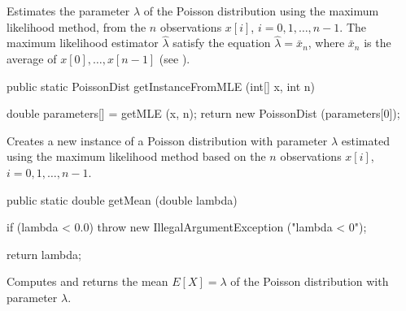 \begin{tabb}
   Estimates the parameter $\lambda$ of the Poisson distribution
   using the maximum likelihood method, from the $n$ observations
   $x[i]$, $i = 0, 1, \ldots, n-1$.
   The maximum likelihood estimator $\hat{\lambda}$ satisfy the equation
   $\hat{\lambda} = \bar{x}_n$,
   where  $\bar{x}_n$ is the average of $x[0], \ldots, x[n-1]$
   (see \cite[page 326]{sLAW00a}).
\end{tabb}
\begin{htmlonly}
\end{htmlonly}
\begin{code}

   public static PoissonDist getInstanceFromMLE (int[] x, int n)\begin{hide} {
      double parameters[] = getMLE (x, n);
      return new PoissonDist (parameters[0]);
   }\end{hide}
\end{code}
\begin{tabb}
   Creates a new instance of a Poisson distribution with parameter $\lambda$
   estimated using the maximum likelihood method based on the $n$ observations
   $x[i]$, $i = 0, 1, \ldots, n-1$.
\end{tabb}
\begin{htmlonly}
\end{htmlonly}
\begin{code}

   public static double getMean (double lambda)\begin{hide} {
      if (lambda < 0.0)
       throw new IllegalArgumentException ("lambda < 0");

      return lambda;
   }\end{hide}
\end{code}
\begin{tabb}  Computes and returns the mean $E[X] = \lambda$ of the
   Poisson distribution with parameter $\lambda$.
\end{tabb}
\begin{htmlonly}
\end{htmlonly}

